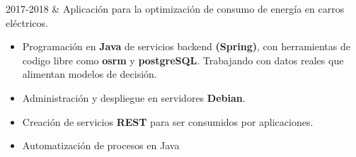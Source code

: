 \documentclass[
    changecolor={111, 156, 45}, 
]{cv-roald}
\begin{document}
\begin{tabularcv}
2017-2018   &   
                \newline Aplicación para la optimización de  consumo de energía en carros eléctricos.
                \begin{itemize}
                  \item Programación en \textbf{Java} de servicios backend \textbf{(Spring)}, con herramientas de codigo libre como \textbf{osrm} y \textbf{postgreSQL}. Trabajando con datos reales que alimentan modelos de decisión. 
                  \item Administración y despliegue en servidores \textbf{Debian}.
                  \item Creación de servicios \textbf{REST} para ser consumidos por aplicaciones.
                  \item Automatización de procesos en Java
                \end{itemize} 
\end{tabularcv} 
\end{document}
